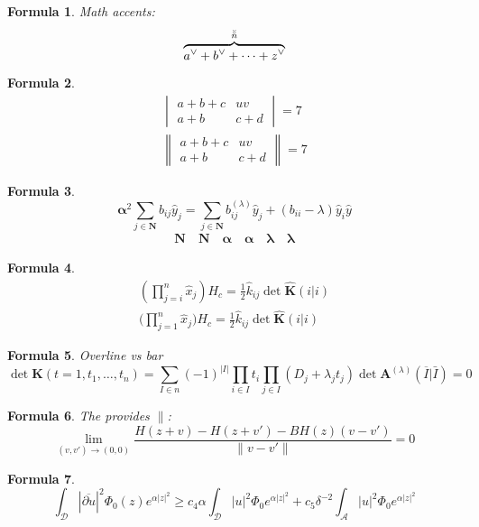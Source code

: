 \documentclass{amsart}
\newtheorem{f}{Formula}
\begin{document}
\begin{f}
    Math accents:
    \[
        \overbrace{a\spcheck + b\spcheck + \dots + z\spcheck}^{\breve{\breve n}}
    \]
\end{f}
\begin{f}
    \begin{gather*}
        \begin{vmatrix}a+b+c &uv\\a+b &c+d\end{vmatrix} = 7\\
        \begin{Vmatrix}a+b+c &uv\\a+b &c+d\end{Vmatrix} = 7
    \end{gather*}
\end{f}
\begin{f}
    \[
        \boldsymbol\alpha^2\sum_{j \in \mathbf N}b_{ij}\hat y_j =
        \sum_{j \in \mathbf N}b_{ij}^{(\lambda)}\hat y_j +
        (b_{ii} - \lambda)\hat y_i\hat y
    \]
    \begin{gather*}
        \mathbf N \quad \boldsymbol N \quad \boldsymbol\alpha \quad
        \mathbf\alpha \quad \mathbf\lambda \quad \boldsymbol\lambda
    \end{gather*}
\end{f}
\begin{f}
    \begin{align*}
        \left(\prod_{j=i}^n \hat x_j \right) H_c =
        \frac{1}{2}\hat k_{ij} \det \hat{\mathbf K}(i|i)\\
        \bigg(\prod^n_{j=1} \hat x_j\bigg) H_c =
        \frac12\hat k_{ij} \det \widehat{\mathbf K}(i|i)
    \end{align*}
\end{f}
\begin{f}
    Overline vs bar
    \[
        \det \mathbf K(t = 1,t_1,\dots,t_n) =
        \sum_{I \in n}(-1)^{|I|}
        \prod_{i \in I} t_i
        \prod_{j \in I} (D_j + \lambda_j t_j)
        \det \mathbf A^{(\lambda)}(\overline I|\bar I) = 0
    \]
\end{f}
\begin{f}
    The \texttt{\textbar} provides $\|$:
    \[
        \lim_{(v,v')\to(0,0)}
        \frac{H(z+v) - H(z+v') -BH(z)(v-v')}
            {\|v-v'\|} = 0
    \]
\end{f}
\begin{f}
    \[
        \int_{\mathcal D} |\overline{\partial u}|^2\Phi_0(z)e^{\alpha|z|^2} \geq c_4\alpha
        \int_{\mathcal D} |u|^2\Phi_0e^{\alpha|z|^2} + c_5\delta^{-2}
        \int_{\mathcal A} |u|^2\Phi_0e^{\alpha|z|^2}
    \]
\end{f}
\end{document}
